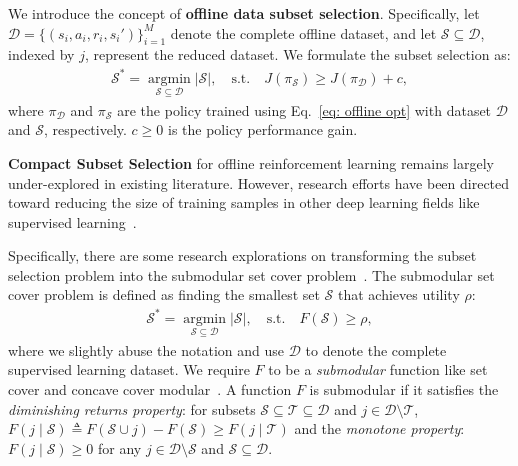 We introduce the concept of \textbf{offline data subset selection}.
Specifically, let $\mathcal{D}=\{(s_{i}, a_{i}, r_i, s_{i}')\}_{i=1}^{M}$ denote the complete offline dataset, and let $\mathcal{S}\subseteq\mathcal{D}$, indexed by $j$, represent the reduced dataset. 
We formulate the subset selection as:
\begin{align}
\label{eq: opt prob}
    \mathcal{S}^* = \mathop{\arg\min}\limits_{\mathcal{S}\subseteq \mathcal{D}}|\mathcal{S}|, \quad
    \text{s.t.} \quad J(\pi_{\mathcal{S}}) \geq J(\pi_{\mathcal{D}}) + c,
\end{align}
where $\pi_{\mathcal{D}}$ and $\pi_{\mathcal{S}}$ are the policy trained using Eq.~\ref{eq: offline opt} with dataset $\mathcal{D}$ and $\mathcal{S}$, respectively. 
$c\geq0$ is the policy performance gain.

\textbf{Compact Subset Selection} \label{sec:omp_description} for offline reinforcement learning remains largely under-explored in existing literature. However, research efforts have been directed toward reducing the size of training samples in other deep learning fields like supervised learning~\citep{killamsetty2021grad, killamsetty2021glister, mirzasoleiman2020coresets}.


Specifically, there are some research explorations on transforming the subset selection problem into the submodular set cover problem~\citep{mirzasoleiman2020coresets}. The submodular set cover problem is defined as finding the smallest set $\mathcal{S}$ that achieves utility $\rho$:
\begin{align}
    \mathcal{S}^* = \mathop{\arg\min}\limits_{\mathcal{S}\subseteq \mathcal{D}}|\mathcal{S}|, \quad \text{s.t.} \quad F(\mathcal{S})\geq \rho,
\end{align}
where we slightly abuse the notation and use $\mathcal{D}$ to denote the complete supervised learning dataset. We require $F$ to be a \emph{submodular} function like set cover and concave cover modular~\citep{iyer2021submodular}. 
A function $F$ is submodular if it satisfies the \emph{diminishing returns property}: for subsets $\mathcal{S}\subseteq\mathcal{T}\subseteq\mathcal{D}$ and $j\in \mathcal{D} \setminus \mathcal{T}$, $ F(j\mid \mathcal{S})\triangleq F(\mathcal{S}\cup j)-F(\mathcal{S})\geq F(j\mid \mathcal{T})$ and the \emph{monotone property}: $F(j\mid \mathcal{S})\geq 0$ for any $j\in \mathcal{D} \setminus \mathcal{S}$ and $\mathcal{S}\subseteq \mathcal{D}$.


